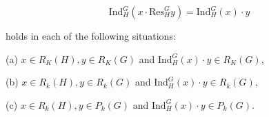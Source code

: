 $$\text{Ind}_H^G(x \cdot \text{Res}_H^G y) = \text{Ind}_H^G(x) \cdot y$$

holds in each of the following situations:

(a) $x \in R_K(H), y \in R_K(G)$ and $\text{Ind}_H^G(x) \cdot y \in R_K(G)$,

(b) $x \in R_k(H), y \in R_k(G)$ and $\text{Ind}_H^G(x) \cdot y \in R_k(G)$,

(c) $x \in R_k(H), y \in P_k(G)$ and $\text{Ind}_H^G(x) \cdot y \in P_k(G).$
